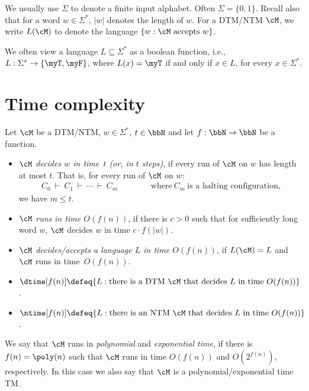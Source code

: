 \documentclass[11pt, a4paper]{article}
\begin{document}
We usually use $\Sigma$ to denote a finite input alphabet. Often $\Sigma=\{0,1\}$.
Recall also that for a word $w\in \Sigma^*$, $|w|$ denotes the length of $w$.
For a DTM/NTM $\cM$, we write $L(\cM)$ to denote the language $\{w : \cM \ \text{accepts}\ w \}$.

We often view a language $L\subseteq \Sigma^*$ as a boolean function,
i.e., $L:\Sigma^*\to \{\myT,\myF\}$, where $L(x)=\myT$ if and only if $x\in L$,
for every $x\in \Sigma^*$.

\section{Time complexity}

\begin{definition}
\label{def:time}
Let $\cM$ be a DTM/NTM, $w\in \Sigma^*$, $t\in \bbN$ and let $f:\bbN\to\bbN$ be a function.
\begin{itemize}
\item 
{\em $\cM$ decides $w$ in time~$t$ (or, in $t$ steps)},
if every run of $\cM$ on $w$ has length at most $t$.
That is, for every run of $\cM$ on $w$:
\begin{eqnarray*}
C_0 \ \vdash \ C_1 \ \vdash \ \cdots \ \vdash \ C_m
& & \hspace{1cm}\mbox{where} \ C_m \ \mbox{is a halting configuration,}
\end{eqnarray*}
we have $m \leq t$.
\item
{\em $\cM$ runs in time $O(f(n))$}, if 
there is $c>0$ such that for sufficiently long word $w$,
$\cM$ decides $w$ in time $c\cdot f(|w|)$.
\item
{\em $\cM$ decides/accepts a language $L$ in time $O(f(n))$},
if $L(\cM)=L$ and $\cM$ runs in time~$O(f(n))$.
\item
$\dtime[f(n)] \defeq 
\{L  :  \text{there is a DTM}\ \cM \ \text{that decides} \ L \ \text{in time} \ O(f(n))\}$.
\item
$\ntime[f(n)] \defeq 
\{L  :  \text{there is an NTM}\ \cM \ \text{that decides} \ L \ \text{in time} \ O(f(n))\}$.
\end{itemize}
\end{definition}
%

We say that $\cM$ runs in {\em polynomial} and {\em exponential time},
if there is $f(n)=\poly(n)$ such that $\cM$ runs in time $O(f(n))$ and $O(2^{f(n)})$, respectively.
In this case we also say that $\cM$ is a polynomial/exponential time TM.
\end{document}
